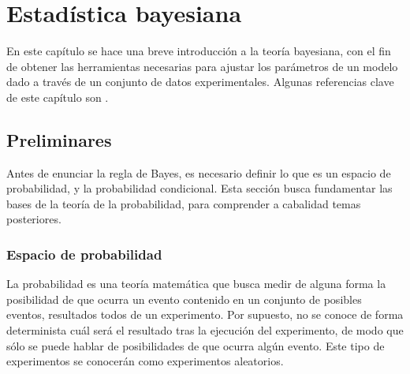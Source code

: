 \chapter{Estadística bayesiana}
En este capítulo se hace una breve introducción a la teoría bayesiana, con el fin de obtener las herramientas necesarias para ajustar los parámetros de un modelo dado a través de un conjunto de datos experimentales. Algunas referencias clave de este capítulo son \cite{Arunachalam,rossi_2018,speagle2019conceptual,kish_1995,brooks_gelman_jones_2011,doi:10.1063/1.1699114}.
\section{Preliminares}
Antes de enunciar la regla de Bayes, es necesario definir lo que es un espacio de probabilidad, y la probabilidad condicional. Esta sección busca fundamentar las bases de la teoría de la probabilidad, para comprender a cabalidad temas posteriores.
\subsection{Espacio de probabilidad}
La probabilidad es una teoría matemática que busca medir de alguna forma la posibilidad de que ocurra un evento contenido en un conjunto de posibles eventos, resultados todos de un experimento. Por supuesto, no se conoce de forma determinista cuál será el resultado tras la ejecución del experimento, de modo que sólo se puede hablar de posibilidades de que ocurra algún evento. Este tipo de experimentos se conocerán como experimentos aleatorios.

